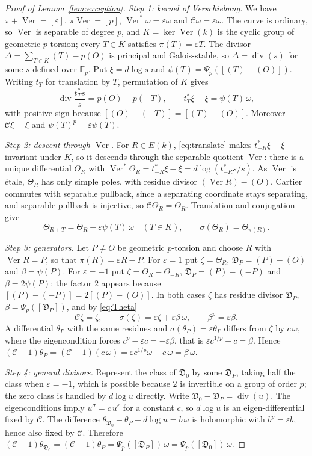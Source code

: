 \documentclass[11pt,a4paper]{article}
\numberwithin{equation}{section}
\theoremstyle{plain}
\theoremstyle{definition}
\DeclareMathOperator{\Ver}{Ver}
\DeclareMathOperator{\divisor}{div}
\newcommand{\F}{\mathbb{F}}
\newcommand{\C}{\mathcal{C}}
\newcommand{\D}{\mathfrak{D}}
\newcommand{\eps}{\varepsilon}
\begin{document}
\begin{proof}[Proof of Lemma~\ref{lem:exception}]
\emph{Step 1: kernel of Verschiebung.} We have $\pi+\Ver=[\eps]$, $\pi\Ver=[p]$, $\Ver^*\omega=\eps\omega$ and $\C\omega=\eps\omega$. The curve is ordinary, so $\Ver$ is separable of degree $p$, and $K=\ker\Ver(k)$ is the cyclic group of geometric $p$-torsion; every $T\in K$ satisfies $\pi(T)=\eps T$. The divisor $\Delta=\sum_{T\in K}(T)-p(O)$ is principal and Galois-stable, so $\Delta=\divisor(s)$ for some $s$ defined over $\F_p$. Put $\xi=d\log s$ and $\psi(T)=\Psi_p([(T)-(O)])$. Writing $t_T$ for translation by $T$, permutation of $K$ gives
\begin{equation}\label{eq:translate}
\divisor\frac{t_T^*s}{s}=p(O)-p(-T),\qquad t_T^*\xi-\xi=\psi(T)\,\omega,
\end{equation}
with positive sign because $[(O)-(-T)]=[(T)-(O)]$. Moreover $\C\xi=\xi$ and $\psi(T)^p=\eps\psi(T)$.

\emph{Step 2: descent through $\Ver$.} For $R\in E(k)$, \eqref{eq:translate} makes $t_{-R}^*\xi-\xi$ invariant under $K$, so it descends through the separable quotient $\Ver$: there is a unique differential $\Theta_R$ with $\Ver^*\Theta_R=t_{-R}^*\xi-\xi=d\log(t_{-R}^*s/s)$. As $\Ver$ is \'etale, $\Theta_R$ has only simple poles, with residue divisor $(\Ver R)-(O)$. Cartier commutes with separable pullback, since a separating coordinate stays separating, and separable pullback is injective, so $\C\Theta_R=\Theta_R$. Translation and conjugation give
\begin{equation}\label{eq:Theta}
\Theta_{R+T}=\Theta_R-\eps\psi(T)\,\omega\quad(T\in K),\qquad \sigma(\Theta_R)=\Theta_{\pi(R)} .
\end{equation}

\emph{Step 3: generators.} Let $P\neq O$ be geometric $p$-torsion and choose $R$ with $\Ver R=P$, so that $\pi(R)=\eps R-P$. For $\eps=1$ put $\zeta=\Theta_R$, $\D_P=(P)-(O)$ and $\beta=\psi(P)$. For $\eps=-1$ put $\zeta=\Theta_R-\Theta_{-R}$, $\D_P=(P)-(-P)$ and $\beta=2\psi(P)$; the factor $2$ appears because $[(P)-(-P)]=2[(P)-(O)]$. In both cases $\zeta$ has residue divisor $\D_P$, $\beta=\Psi_p([\D_P])$, and by \eqref{eq:Theta}
\[
\C\zeta=\zeta,\qquad \sigma(\zeta)=\eps\zeta+\eps\beta\,\omega,\qquad \beta^p=\eps\beta .
\]
A differential $\theta_P$ with the same residues and $\sigma(\theta_P)=\eps\theta_P$ differs from $\zeta$ by $c\,\omega$, where the eigencondition forces $c^p-\eps c=-\eps\beta$, that is $\eps c^{1/p}-c=\beta$. Hence $(\C-1)\theta_P=(\C-1)(c\,\omega)=\eps c^{1/p}\omega-c\,\omega=\beta\,\omega$.

\emph{Step 4: general divisors.} Represent the class of $\D_0$ by some $\D_P$, taking half the class when $\eps=-1$, which is possible because $2$ is invertible on a group of order $p$; the zero class is handled by $d\log u$ directly. Write $\D_0-\D_P=\divisor(u)$. The eigenconditions imply $u^\sigma=c\,u^\eps$ for a constant $c$, so $d\log u$ is an eigen-differential fixed by $\C$. The difference $\theta_{\D_0}-\theta_P-d\log u=b\,\omega$ is holomorphic with $b^p=\eps b$, hence also fixed by $\C$. Therefore $(\C-1)\theta_{\D_0}=(\C-1)\theta_P=\Psi_p([\D_P])\,\omega=\Psi_p([\D_0])\,\omega$.
\end{proof}
\end{document}
